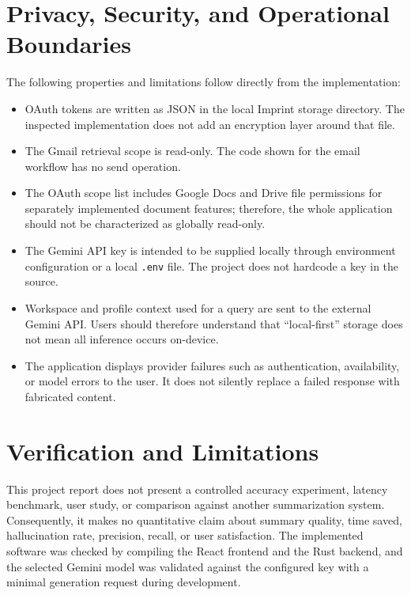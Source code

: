\documentclass[conference]{IEEEtran}
\begin{document}
\section{Privacy, Security, and Operational Boundaries}

The following properties and limitations follow directly from the implementation:

\begin{itemize}
    \item OAuth tokens are written as JSON in the local Imprint storage directory. The inspected implementation does not add an encryption layer around that file.
    \item The Gmail retrieval scope is read-only. The code shown for the email workflow has no send operation.
    \item The OAuth scope list includes Google Docs and Drive file permissions for separately implemented document features; therefore, the whole application should not be characterized as globally read-only.
    \item The Gemini API key is intended to be supplied locally through environment configuration or a local \texttt{.env} file. The project does not hardcode a key in the source.
    \item Workspace and profile context used for a query are sent to the external Gemini API. Users should therefore understand that ``local-first'' storage does not mean all inference occurs on-device.
    \item The application displays provider failures such as authentication, availability, or model errors to the user. It does not silently replace a failed response with fabricated content.
\end{itemize}

\section{Verification and Limitations}

This project report does not present a controlled accuracy experiment, latency benchmark, user study, or comparison against another summarization system. Consequently, it makes no quantitative claim about summary quality, time saved, hallucination rate, precision, recall, or user satisfaction. The implemented software was checked by compiling the React frontend and the Rust backend, and the selected Gemini model was validated against the configured key with a minimal generation request during development.
\end{document}
